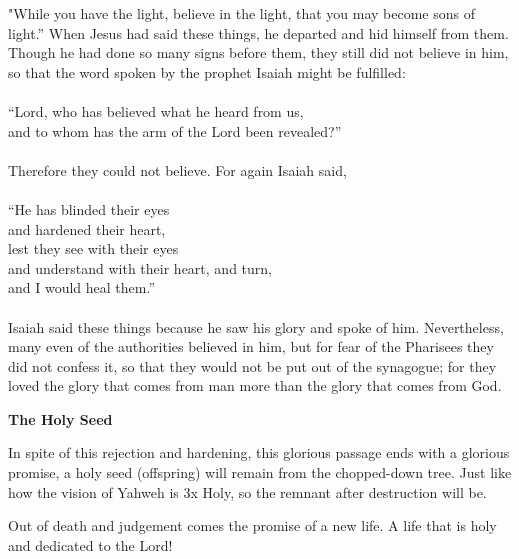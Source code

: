 \documentclass[11pt]{article}
\begin{document}
\begin{versesection}{2em}


 "While you have the light, believe in the light, that you may become sons of light.” When Jesus had said these things, he departed and hid himself from them.  Though he had done so many signs before them, they still did not believe in him,  so that the word spoken by the prophet Isaiah might be fulfilled:\\\\ “Lord, who has believed what he heard from us,\\ \poetryline{} and to whom has the arm of the Lord been revealed?” \\\\  Therefore they could not believe. For again Isaiah said,\\\\  “He has blinded their eyes\\ \poetryline{} and hardened their heart,\\ lest they see with their eyes\\ \poetryline{} and understand with their heart, and turn,\\ \poetryline{} and I would heal them.”\\\\  Isaiah said these things because he saw his glory and spoke of him.  Nevertheless, many even of the authorities believed in him, but for fear of the Pharisees they did not confess it, so that they would not be put out of the synagogue;  for they loved the glory that comes from man more than the glory that comes from God.

\end{versesection}

{\vspace{2em}}
{\large\bfseries The Holy Seed}

{\vspace{1em}}

In spite of this rejection and hardening, this glorious passage ends with a glorious promise, a holy seed (offspring) will remain from the chopped-down tree. Just like how the vision of Yahweh is 3x Holy, so the remnant after destruction will be.

Out of death and judgement comes the promise of a new life. A life that is holy and dedicated to the Lord!
\end{document}
